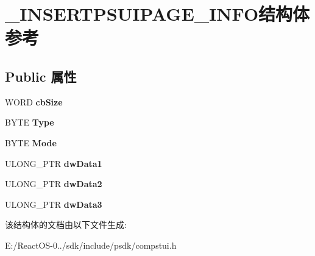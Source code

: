 \hypertarget{struct___i_n_s_e_r_t_p_s_u_i_p_a_g_e___i_n_f_o}{}\section{\+\_\+\+I\+N\+S\+E\+R\+T\+P\+S\+U\+I\+P\+A\+G\+E\+\_\+\+I\+N\+F\+O结构体 参考}
\label{struct___i_n_s_e_r_t_p_s_u_i_p_a_g_e___i_n_f_o}
\subsection*{Public 属性}
\begin{DoxyCompactItemize}
\item 
\mbox{\label{struct___i_n_s_e_r_t_p_s_u_i_p_a_g_e___i_n_f_o_aea7a897c9304278a136d7f39d8c3c21a}} 
W\+O\+RD {\bfseries cb\+Size}
\item 
\mbox{\label{struct___i_n_s_e_r_t_p_s_u_i_p_a_g_e___i_n_f_o_af7ab1a3fb8b0bc8fbd1b19bc150c1952}} 
B\+Y\+TE {\bfseries Type}
\item 
\mbox{\label{struct___i_n_s_e_r_t_p_s_u_i_p_a_g_e___i_n_f_o_a9b1e71ed326d780811a4a5a978ab4e44}} 
B\+Y\+TE {\bfseries Mode}
\item 
\mbox{\label{struct___i_n_s_e_r_t_p_s_u_i_p_a_g_e___i_n_f_o_a0825e09652dd922b22bb1b389802423f}} 
U\+L\+O\+N\+G\+\_\+\+P\+TR {\bfseries dw\+Data1}
\item 
\mbox{\label{struct___i_n_s_e_r_t_p_s_u_i_p_a_g_e___i_n_f_o_a9c12fe1c9bd4f851263f7ff7fc0efddf}} 
U\+L\+O\+N\+G\+\_\+\+P\+TR {\bfseries dw\+Data2}
\item 
\mbox{\label{struct___i_n_s_e_r_t_p_s_u_i_p_a_g_e___i_n_f_o_adef14c16826a9a998e3ecba4f03407b3}} 
U\+L\+O\+N\+G\+\_\+\+P\+TR {\bfseries dw\+Data3}
\end{DoxyCompactItemize}


该结构体的文档由以下文件生成\+:\begin{DoxyCompactItemize}
\item 
E\+:/\+React\+O\+S-\/0../sdk/include/psdk/compstui.\+h\end{DoxyCompactItemize}
